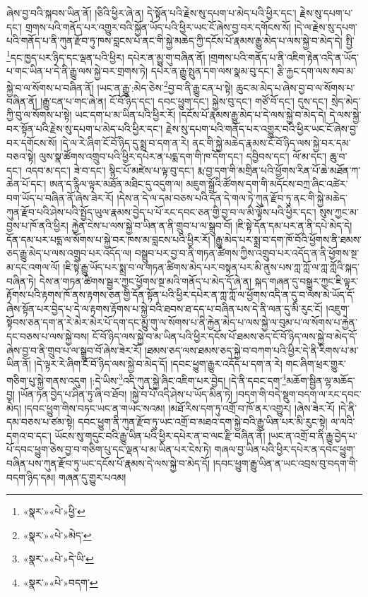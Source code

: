 ཞེས་བྱ་བའི་སྐབས་ཡིན་ནོ། །ཅིའི་ཕྱིར་ཞེ་ན། དེ་སྟོན་པའི་རྗེས་སུ་དཔག་པ་མེད་པའི་ཕྱིར་དང་། རྗེས་སུ་དཔག་པ་དང་། གྲགས་པའི་གནོད་པར་འགྱུར་བའི་སྐྱོན་ཡོད་པའི་ཕྱིར་ཡང་ངོ་ཞེས་བྱ་བར་དགོངས་སོ། །དེ་ལ་རྗེས་སུ་དཔག་པའི་གནོད་པ་ནི་ཀུན་རྫོབ་ཏུ་ཁས་བླངས་པ་ནང་གི་སྐྱེ་མཆེད་ཀྱི་དངོས་པོ་རྣམས་རྒྱུ་མེད་པ་ལས་སྐྱེ་བ་མེད་དེ། སྤྱི་\footnote{«སྣར་»«པེ་»ཕྱི་}དང་ཁྱད་པར་ཉིད་དང་ལྡན་པའི་ཕྱིར། དཔེར་ན་མྱུ་གུ་བཞིན་ནོ། །གྲགས་པའི་གནོད་པ་ནི་འཇིག་རྟེན་འདི་ན་ཡོད་པ་གང་ཡིན་པ་དེ་ནི་རྒྱུ་ལས་སྐྱེ་བར་གྲགས་ཏེ། དཔེར་ན་རྒྱུ་སྤུན་དག་ལས་སྣམ་བུ་དང་། རྩི་རྐྱང་དག་ལས་སབ་མ་སྐྱེ་བ་ལ་སོགས་པ་བཞིན་ནོ། །ཡང་ན་རྒྱུ་:མེད་ཅེས་\footnote{«སྣར་»«པེ་»མེད་}བྱ་བ་ནི་རྒྱུ་ངན་པ་སྟེ། ཆུང་མ་མེད་པ་ཞེས་བྱ་བ་ལ་སོགས་པ་བཞིན་ནོ། །རྒྱུ་ངན་པ་གང་ཞེ་ན། ངོ་བོ་ཉིད་དང་། དབང་ཕྱུག་དང་། སྐྱེས་བུ་དང་། གཙོ་བོ་དང་། དུས་དང་། སྲེད་མེད་ཀྱི་བུ་ལ་སོགས་པ་སྟེ། ཡང་དག་པ་མ་ཡིན་པའི་ཕྱིར་རོ། །དངོས་པོ་རྣམས་རྒྱུ་མེད་པ་དེ་ལས་སྐྱེ་བ་མེད་དེ། དེ་ལས་སྐྱེ་བར་སྟོན་པའི་རྗེས་སུ་དཔག་པ་མེད་པའི་ཕྱིར་དང་། རྗེས་སུ་དཔག་པའི་གནོད་པར་འགྱུར་བའི་ཕྱིར་ཡང་ངོ་ཞེས་བྱ་བར་དགོངས་སོ། །དེ་ལ་རེ་ཞིག་ངོ་བོ་ཉིད་དུ་སྨྲ་བ་དག་ན་རེ། ནང་གི་སྐྱེ་མཆེད་རྣམས་ངོ་བོ་ཉིད་ལས་སྐྱེ་བར་དམ་བཅའ་སྟེ། ལུས་སྣ་ཚོགས་འགྲུབ་པའི་ཕྱིར་དཔེར་ན་པདྨ་དག་གི་ཁ་དོག་དང་། དབྱིབས་དང་། ལོ་མ་དང་། ཆུ་བ་དང་། འདབ་མ་དང་། ཟེ་བ་དང་། སྙིང་པོ་མཛེས་པ་ལྟ་བུ་དང་། རྨ་བྱ་དག་གི་མགྲིན་པའི་ཕྱོགས་རིན་པོ་ཆེ་མཐོན་ཀ་ཆེན་པོ་དང་། ཨན་ད་རྙིལ་ལྟར་མཐོན་མཐིང་དུ་འདུག་ལ། མཇུག་སྒྲོའི་ཚོགས་དག་གི་མདོངས་བཀྲ་ཞིང་འཚེར་བག་ཡོད་པ་བཞིན་ནོ་ཞེས་ཟེར་རོ། །དེས་ན་དེ་ལ་དམ་བཅས་པའི་དོན་དེ་གལ་ཏེ་ཀུན་རྫོབ་ཏུ་ནང་གི་སྐྱེ་མཆེད་ཀུན་རྫོབ་པའི་ཤེས་པའི་སྤྱོད་ཡུལ་རྣམས་བྱེད་པ་པོ་རང་དབང་ཅན་གྱི་བྱ་བ་ལ་མི་ལྟོས་པའི་ཕྱིར་དང་། སུས་ཀྱང་མ་བྱས་པ་ཁོ་ནའི་ཕྱིར། རྐྱེན་ངེས་པ་ལས་སྐྱེ་བ་ཡིན་ན་ནི་གྲུབ་པ་ལ་སྒྲུབ་བོ། །ཇི་སྟེ་དོན་དམ་པར་ན་ནི་དཔེ་མེད་དེ། དོན་དམ་པར་པདྨ་ལ་སོགས་པ་སྐྱེ་བར་ཁས་མ་བླངས་པའི་ཕྱིར་རོ། །རྒྱུ་མེད་པར་སྨྲ་བ་དག་ཁོ་བོའི་ཕྱོགས་ནི་ཐམས་ཅད་རྒྱུ་མེད་པ་ལས་འགྲུབ་པར་འདོད་ལ། བསྒྲུབ་པར་བྱ་བ་ནི་གཏན་ཚིགས་ཀྱིས་འགྲུབ་པར་འདོད་ན་ནི་ཕྱོགས་སྔ་མ་དང་འགལ་ལོ། །ཇི་སྟེ་རྒྱུ་ཡོད་པར་སྨྲ་བ་ལ་གཏན་ཚིགས་མེད་པར་བསྟན་པར་མི་ནུས་པས་ཀླ་ཀློ་ལ་ཀླ་ཀློའི་སྐད་བཞིན་ཏེ། དེས་ན་གཏན་ཚིགས་སྦྱར་ཀྱང་ཕྱོགས་སྔ་མའི་གནོད་པ་མེད་དོ་ཞེ་ན། སྐད་གཞན་དུ་བསྒྱུར་ཀྱང་ཇི་ལྟར་རྟོགས་པའི་རྟགས་ཁོ་ནས་རྟགས་ཅན་གྱི་དོན་སྟོན་པའི་ཕྱིར་དཔེར་ན་ཀླ་ཀློ་ལ་ཕྱོགས་འདི་ན་དུ་བ་ལས་མེ་ཡོད་དོ་ཞེས་སྟོན་པར་བྱེད་པ་དེ་ལ་རྟགས་རྟོགས་པ་སྐྱེ་བའི་ཐབས་ཐ་དད་པ་བཞིན་པས་དེ་ནི་ལན་དུ་མི་རུང་ངོ། །འཇུག་སྟོབས་ཅན་དག་ན་རེ་མེར་མེར་པོ་དག་དང་མྱུ་གུ་ལ་སོགས་པ་ནི་རྐྱེན་མེད་པ་ལས་སྐྱེ་ལ་བུམ་པ་ལ་སོགས་པ་རྐྱེན་དང་བཅས་པ་ལས་སྐྱེ་བས། ངོ་བོ་ཉིད་ལས་སྐྱེ་བ་མ་ཡིན་པའི་ཕྱིར་དངོས་པོ་ཐམས་ཅད་ངོ་བོ་ཉིད་ལས་སྐྱེ་བ་མེད་དོ་ཞེས་བྱ་བ་ནི་གྲུབ་པ་ལ་སྒྲུབ་བོ་ཞེས་ཟེར་རོ། །ཐམས་ཅད་ལས་ཐམས་ཅད་སྐྱེ་བ་བཀག་པའི་ཕྱིར་དེ་ནི་རིགས་པ་མ་ཡིན་ནོ། །དེ་ལྟར་རེ་ཞིག་ངོ་བོ་ཉིད་ལས་སྐྱེ་བ་མེད་དོ། །དབང་ཕྱུག་རྒྱུར་འདོད་པ་དག་ན་རེ། གང་ཞིག་ཕྲར་གྱུར་གཅིག་པུ་སྐྱེ་གནས་འདུག །:དེ་ཡིས་\footnote{«སྣར་»«པེ་»དེ་ཡི་}འདི་ཀུན་སྐྱེ་ཞིང་འཇིག་པར་བྱེད། །དེ་ནི་དབང་དག་\footnote{«སྣར་»«པེ་»བདག་}མཆོག་སྦྱིན་ལྷ་མཆོད་བྱ། །ཡོན་ཏན་བྱེད་པ་ཤིན་ཏུ་ཞི་བ་ཐོབ། །སྐྱེ་བ་པོ་འདི་ཤེས་པ་ཡོད་མིན་ཏེ། །བདག་གི་བདེ་སྡུག་བདག་ལ་རང་དབང་མེད། །དབང་ཕྱུག་གིས་བཏང་ཡང་ན་གཡང་སའམ། །མཐོ་རིས་དག་ཏུ་འགྲོ་བ་ཁོ་ནར་འགྱུར། །ཞེས་ཟེར་རོ། །དེ་ནི་དམ་བཅས་པ་ཙམ་སྟེ། དབང་ཕྱུག་ནི་ཀུན་རྫོབ་ཏུ་ཡང་འགྲོ་བ་མཐའ་དག་སྐྱེ་བའི་རྒྱུ་ཡིན་པར་མི་རུང་སྟེ། ལ་ལའི་དགའ་བ་དང་། ཡོངས་སུ་གདུང་བའི་རྒྱུ་ཡིན་པའི་ཕྱིར་དཔེར་ན་བ་ལང་རྫི་བཞིན་ནོ། །ཡང་ན་འགྲོ་བ་ནི་རྒྱུ་བྱེད་པ་པོ་དབང་ཕྱུག་ཅེས་བྱ་བ་གཅིག་པུ་དང་ལྡན་པ་མ་ཡིན་པར་ངེས་ཏེ། གཞལ་བྱ་ཡིན་པའི་ཕྱིར་དཔེར་ན་དབང་ཕྱུག་བཞིན་པས་ཀུན་རྫོབ་ཏུ་ཡང་དངོས་པོ་རྣམས་དེ་ལས་སྐྱེ་བ་མེད་དོ། །དབང་ཕྱུག་རྒྱུ་ཡིན་ན་ཡང་འབྲས་བུ་བདག་གི་བདག་ཉིད་དམ། གཞན་དུ་གྱུར་པའམ། 
